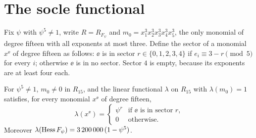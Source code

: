 \section{The socle functional}\label{sec:socle}

Fix $\psi$ with $\psi^5\ne1$, write $R=R_{F_\psi}$ and $m_0=x_1^3x_2^3
x_3^3x_4^3x_5^3$, the only monomial of degree fifteen with all exponents at
most three. Define the sector of a monomial $x^{\ee}$ of degree fifteen as
follows: $\ee$ is in sector $r\in\{0,1,2,3,4\}$ if $e_i\equiv 3-r\pmod5$
for every $i$; otherwise $\ee$ is in no sector. Sector $4$ is empty, because
its exponents are at least four each.

\begin{theorem}\label{thm:socle}
For $\psi^5\ne1$, $m_0\ne0$ in $R_{15}$, and the linear functional
$\lambda$ on $R_{15}$ with $\lambda(m_0)=1$ satisfies, for every monomial
$x^{\ee}$ of degree fifteen,
\[
\lambda(x^{\ee})=\begin{cases}\psi^{r}&\text{if $\ee$ is in sector $r$,}\\
0&\text{otherwise.}\end{cases}
\]
Moreover $\lambda(\operatorname{Hess} F_\psi)=3\,200\,000\,(1-\psi^5)$.
\end{theorem}

